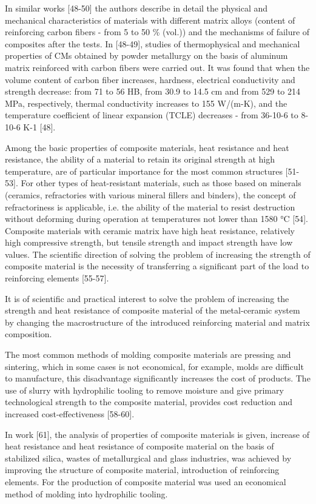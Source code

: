 \begin{multicols}{2}
In similar works {[}48-50{]} the authors describe in detail the physical
and mechanical characteristics of materials with different matrix alloys
(content of reinforcing carbon fibers - from 5 to 50 \% (vol.)) and the
mechanisms of failure of composites after the tests. In {[}48-49{]},
studies of thermophysical and mechanical properties of CMs obtained by
powder metallurgy on the basis of aluminum matrix reinforced with carbon
fibers were carried out. It was found that when the volume content of
carbon fiber increases, hardness, electrical conductivity and strength
decrease: from 71 to 56 HB, from 30.9 to 14.5 cm and from 529 to 214
MPa, respectively, thermal conductivity increases to 155 W/(m-K), and
the temperature coefficient of linear expansion (TCLE) decreases - from
36-10-6 to 8-10-6 K-1 {[}48{]}.

Among the basic properties of composite materials, heat resistance and
heat resistance, the ability of a material to retain its original
strength at high temperature, are of particular importance for the most
common structures {[}51-53{]}. For other types of heat-resistant
materials, such as those based on minerals (ceramics, refractories with
various mineral fillers and binders), the concept of refractoriness is
applicable, i.e. the ability of the material to resist destruction
without deforming during operation at temperatures not lower than 1580
°C {[}54{]}. Composite materials with ceramic matrix have high heat
resistance, relatively high compressive strength, but tensile strength
and impact strength have low values. The scientific direction of solving
the problem of increasing the strength of composite material is the
necessity of transferring a significant part of the load to reinforcing
elements {[}55-57{]}.

It is of scientific and practical interest to solve the problem of
increasing the strength and heat resistance of composite material of the
metal-ceramic system by changing the macrostructure of the introduced
reinforcing material and matrix composition.

The most common methods of molding composite materials are pressing and
sintering, which in some cases is not economical, for example, molds are
difficult to manufacture, this disadvantage significantly increases the
cost of products. The use of slurry with hydrophilic tooling to remove
moisture and give primary technological strength to the composite
material, provides cost reduction and increased cost-effectiveness
{[}58-60{]}.

In work {[}61{]}, the analysis of properties of composite materials is
given, increase of heat resistance and heat resistance of composite
material on the basis of stabilized silica, wastes of metallurgical and
glass industries, was achieved by improving the structure of composite
material, introduction of reinforcing elements. For the production of
composite material was used an economical method of molding into
hydrophilic tooling.


\end{multicols}
